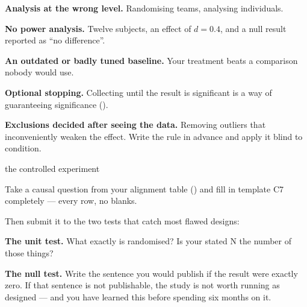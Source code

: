 \begin{pitfall}
\begin{tight}
  \item \textbf{Analysis at the wrong level.} Randomising teams, analysing
    individuals.
  \item \textbf{No power analysis.} Twelve subjects, an effect of $d = 0.4$,
    and a null result reported as ``no difference''.
  \item \textbf{An outdated or badly tuned baseline.} Your treatment beats a
    comparison nobody would use.
  \item \textbf{Optional stopping.} Collecting until the result is significant
    is a way of guaranteeing significance ().
  \item \textbf{Exclusions decided after seeing the data.} Removing outliers
    that inconveniently weaken the effect. Write the rule in advance and apply
    it blind to condition.
\end{tight}
\end{pitfall}

\begin{traditions}{the controlled experiment}
\end{traditions}

\begin{lab}
Take a causal question from your alignment table () and fill in
template C7 completely --- every row, no blanks.

\medskip
Then submit it to the two tests that catch most flawed designs:
\begin{tightnum}
  \item \textbf{The unit test.} What exactly is randomised? Is your stated N the
    number of those things?
  \item \textbf{The null test.} Write the sentence you would publish if the
    result were exactly zero. If that sentence is not publishable, the study is
    not worth running as designed --- and you have learned this before spending
    six months on it.
\end{tightnum}
\end{lab}


